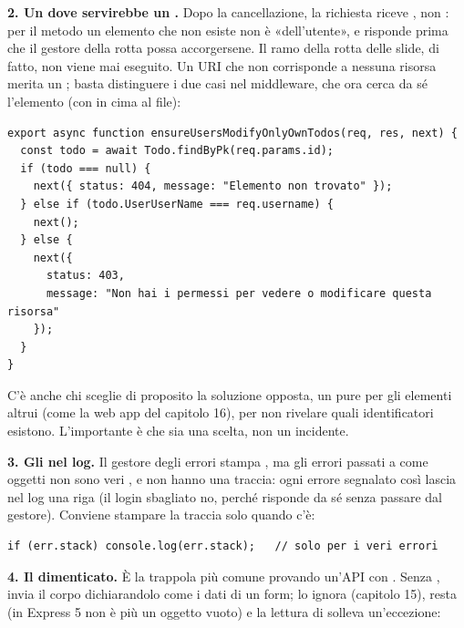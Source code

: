 \textbf{2. Un  dove servirebbe un .} Dopo la cancellazione,
la richiesta  riceve , non : per il
metodo  un elemento che non esiste non è «dell'utente», e
 risponde prima che il gestore della rotta
possa accorgersene. Il ramo  della rotta delle slide, di fatto, non
viene mai eseguito. Un URI che non corrisponde a nessuna risorsa merita un
; basta distinguere i due casi nel middleware, che ora cerca da sé
l'elemento (con  in cima
al file):

\begin{lstlisting}[style=js, name=middleware/authorization.js, firstnumber=21]
export async function ensureUsersModifyOnlyOwnTodos(req, res, next) {
  const todo = await Todo.findByPk(req.params.id);
  if (todo === null) {
    next({ status: 404, message: "Elemento non trovato" });
  } else if (todo.UserUserName === req.username) {
    next();
  } else {
    next({
      status: 403,
      message: "Non hai i permessi per vedere o modificare questa risorsa"
    });
  }
}
\end{lstlisting}

C'è anche chi sceglie di proposito la soluzione opposta, un  pure per
gli elementi altrui (come la web app del capitolo 16), per non rivelare quali
identificatori esistono. L'importante è che sia una scelta, non un incidente.

\textbf{3. Gli  nel log.} Il gestore degli errori stampa
, ma gli errori passati a  come oggetti
 non sono veri , e non hanno una
traccia: ogni errore segnalato così lascia nel log una riga 
(il login sbagliato no, perché risponde da sé senza passare dal gestore).
Conviene stampare la traccia solo quando c'è:

\begin{lstlisting}[style=js, name=index.js, firstnumber=27]
  if (err.stack) console.log(err.stack);   // solo per i veri errori
\end{lstlisting}

\textbf{4. Il  dimenticato.} È la trappola più comune
provando un'API con . Senza ,  invia il corpo dichiarandolo come i dati di
un form;  lo ignora (capitolo 15),  resta
 (in Express 5 non è più un oggetto vuoto) e la lettura di
 solleva un'eccezione:

